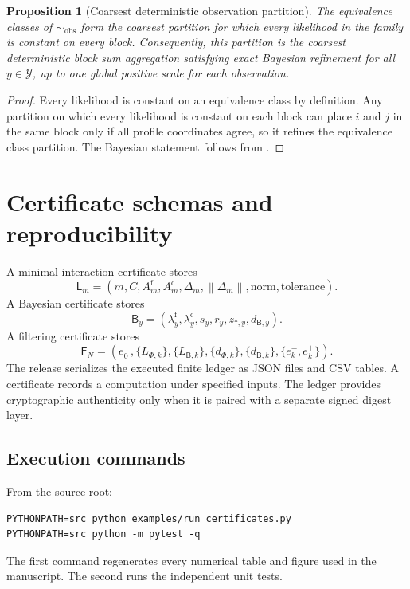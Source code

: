 \documentclass[11pt]{article}
\newtheorem{proposition}[theorem]{Proposition}
\theoremstyle{definition}
\theoremstyle{remark}
\newcommand{\cY}{\mathcal Y}
\newcommand{\norm}[1]{\left\lVert #1\right\rVert}
\newcommand{\fine}{\mathrm f}
\newcommand{\coarse}{\mathrm c}
\newcommand{\Bup}{\mathsf B}
\begin{document}
\begin{proposition}[Coarsest deterministic observation partition]\label{prop:coarsest-observation-partition}
The equivalence classes of $\sim_{\mathrm{obs}}$ form the coarsest partition for which every likelihood in the family is constant on every block.  Consequently, this partition is the coarsest deterministic block sum aggregation satisfying exact Bayesian refinement for all $y\in\cY$, up to one global positive scale for each observation.
\end{proposition}

\begin{proof}
Every likelihood is constant on an equivalence class by definition.  Any partition on which every likelihood is constant on each block can place $i$ and $j$ in the same block only if all profile coordinates agree, so it refines the equivalence class partition.  The Bayesian statement follows from .
\end{proof}

\section{Certificate schemas and reproducibility}\label{app:schemas}
A minimal interaction certificate stores
\begin{equation}\label{eq:lumpability-certificate-schema}
  \mathsf L_m
  =
  (m,C,A_m^{\fine},A_m^{\coarse},\Delta_m,
  \norm{\Delta_m},\text{norm},\text{tolerance}).
\end{equation}
A Bayesian certificate stores
\begin{equation}\label{eq:bayes-certificate-schema}
  \mathsf B_y
  =
  (\lambda_y^{\fine},\lambda_y^{\coarse},s_y,r_y,
  z_{*,y},d_{\Bup,y}).
\end{equation}
A filtering certificate stores
\begin{equation}\label{eq:filter-certificate-schema}
  \mathsf F_N
  =
  (e_0^+,\{L_{\Phi,k}\},\{L_{\Bup,k}\},
  \{d_{\Phi,k}\},\{d_{\Bup,k}\},
  \{e_k^-,e_k^+\}).
\end{equation}
The release serializes the executed finite ledger as JSON files and CSV tables.  A certificate records a computation under specified inputs.  The ledger provides cryptographic authenticity only when it is paired with a separate signed digest layer.

\subsection{Execution commands}
From the source root:
\begin{lstlisting}[style=code]
PYTHONPATH=src python examples/run_certificates.py
PYTHONPATH=src python -m pytest -q
\end{lstlisting}
The first command regenerates every numerical table and figure used in the manuscript.  The second runs the independent unit tests.
\end{document}
